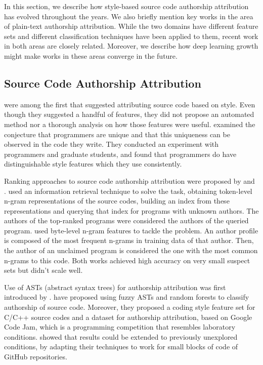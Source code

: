 In this section, we describe how style-based source code authorship attribution has evolved throughout the years. We also briefly mention key works in the area of plain-text authorship attribution. While the two domains have different feature sets and different classification techniques have been applied to them, recent work in both areas are closely related. Moreover, we describe how deep learning growth might make works in these areas converge in the future.

\subsection{Source Code Authorship Attribution}

 were among the first that suggested attributing source code based on style. Even though they suggested a handful of features, they did not propose an automated method nor a thorough analysis on how those features were useful.  examined the conjecture that programmers are unique and that this uniqueness can be observed in the code they write. They conducted an experiment with programmers and graduate students, and found that programmers do have distinguishable style features which they use consistently.

Ranking approaches to source code authorship attribution were proposed by  and .  used an information retrieval technique to solve the task, obtaining token-level n-gram representations of the source codes, building an index from these representations and querying that index for programs with unknown authors. The authors of the top-ranked programs were considered the authors of the queried program.  used byte-level n-gram features to tackle the problem. An author profile is composed of the most frequent n-grams in training data of that author. Then, the author of an unclaimed program is considered the one with the most common n-grams to this code. Both works achieved high accuracy on very small suspect sets but didn't scale well.

Use of ASTs (abstract syntax trees) for authorship attribution was first introduced by .  have proposed using fuzzy ASTs and random forests to classify authorship of source code. Moreover, they proposed a coding style feature set for C/C++ source codes and a dataset for authorship attribution, based on Google Code Jam, which is a programming competition that resembles laboratory conditions.  showed that  results could be extended to previously unexplored conditions, by adapting their techniques to work for small blocks of code of GitHub repositories.

